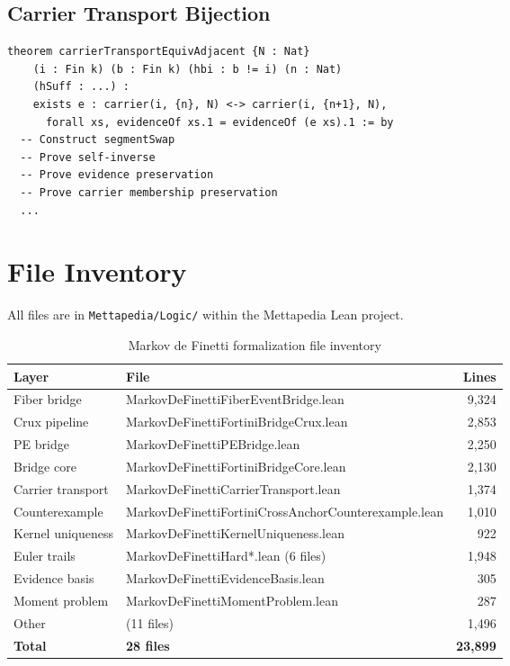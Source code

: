\documentclass[11pt,a4paper]{article}
\theoremstyle{definition}
\begin{document}
\subsection{Carrier Transport Bijection}

\begin{lstlisting}
theorem carrierTransportEquivAdjacent {N : Nat}
    (i : Fin k) (b : Fin k) (hbi : b != i) (n : Nat)
    (hSuff : ...) :
    exists e : carrier(i, {n}, N) <-> carrier(i, {n+1}, N),
      forall xs, evidenceOf xs.1 = evidenceOf (e xs).1 := by
  -- Construct segmentSwap
  -- Prove self-inverse
  -- Prove evidence preservation
  -- Prove carrier membership preservation
  ...
\end{lstlisting}

\section{File Inventory}

All files are in \texttt{Mettapedia/Logic/} within the Mettapedia Lean project.

\begin{table}[h]
\centering
\begin{tabular}{llr}
\toprule
\textbf{Layer} & \textbf{File} & \textbf{Lines} \\
\midrule
Fiber bridge & MarkovDeFinettiFiberEventBridge.lean & 9,324 \\
Crux pipeline & MarkovDeFinettiFortiniBridgeCrux.lean & 2,853 \\
PE bridge & MarkovDeFinettiPEBridge.lean & 2,250 \\
Bridge core & MarkovDeFinettiFortiniBridgeCore.lean & 2,130 \\
Carrier transport & MarkovDeFinettiCarrierTransport.lean & 1,374 \\
Counterexample & MarkovDeFinettiFortiniCrossAnchorCounterexample.lean & 1,010 \\
Kernel uniqueness & MarkovDeFinettiKernelUniqueness.lean & 922 \\
Euler trails & MarkovDeFinettiHard*.lean (6 files) & 1,948 \\
Evidence basis & MarkovDeFinettiEvidenceBasis.lean & 305 \\
Moment problem & MarkovDeFinettiMomentProblem.lean & 287 \\
Other & (11 files) & 1,496 \\
\midrule
\textbf{Total} & \textbf{28 files} & \textbf{23,899} \\
\bottomrule
\end{tabular}
\caption{Markov de Finetti formalization file inventory}
\end{table}
\end{document}
